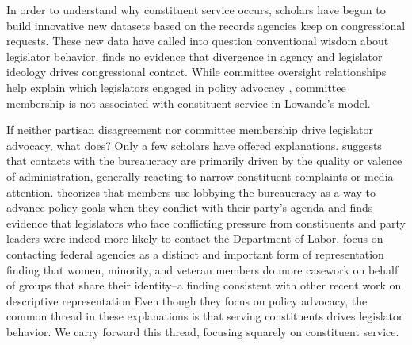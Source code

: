 \documentclass{article}
\begin{document}



In order to understand why constituent service occurs, scholars have begun to build innovative new datasets based on the records agencies keep on congressional requests. These new data have called into question conventional wisdom about legislator behavior. \citet{Lowande2018JOP} finds no evidence that divergence in agency and legislator ideology drives congressional contact. While committee oversight relationships help explain which legislators engaged in policy advocacy \citep{Ritchie2017, Lowande2018JOP}, committee membership is not associated with constituent service in Lowande's model.

If neither partisan disagreement nor committee membership drive legislator advocacy, what does? Only a few scholars have offered explanations.
\citet{Lowande2018JOP} suggests that contacts with the bureaucracy are primarily driven by the quality or valence of administration, generally reacting to narrow constituent complaints or media attention. 
\citet{Ritchie2017} theorizes that members use lobbying the bureaucracy as a way to advance policy goals when they conflict with their party's agenda and finds evidence that legislators who face conflicting pressure from constituents and party leaders were indeed more likely to contact the Department of Labor. 
\citet{LowandeRitchieLauterbach2018} focus on contacting federal agencies as a distinct and important form of representation finding that women, minority, and veteran members do more casework on behalf of groups that share their identity--a finding consistent with other recent work on descriptive representation %
Even though they focus on policy advocacy, the common thread in these explanations is that serving constituents drives legislator behavior. We carry forward this thread, focusing squarely on constituent service. 
\end{document}

